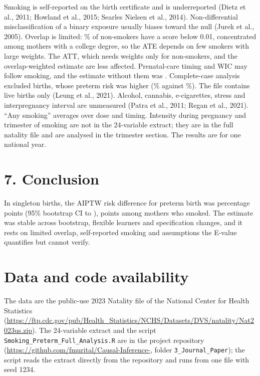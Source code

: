\documentclass[11pt,letterpaper]{article}
\begin{document}
Smoking is self-reported on the birth certificate and is underreported (Dietz et al., 2011; Howland et al., 2015; Searles Nielsen et al., 2014). Non-differential misclassification of a binary exposure usually biases toward the null (Jurek et al., 2005). Overlap is limited: \LowNon{}\% of non-smokers have a score below 0.01, concentrated among mothers with a college degree, so the ATE depends on few smokers with large weights. The ATT, which needs weights only for non-smokers, and the overlap-weighted estimate are less affected. Prenatal-care timing and WIC may follow smoking, and the estimate without them was \RDPre{}. Complete-case analysis excluded \NDropped{} births, whose preterm risk was higher (\DroppedPreterm{}\% against \KeptPreterm{}\%). The file contains live births only (Leung et al., 2021). Alcohol, cannabis, e-cigarettes, stress and interpregnancy interval are unmeasured (Patra et al., 2011; Regan et al., 2021). ``Any smoking'' averages over dose and timing. Intensity during pregnancy and trimester of smoking are not in the 24-variable extract; they are in the full natality file and are analysed in the trimester section. The results are for one national year.

\section*{7. Conclusion}

In \NTotal{} singleton births, the AIPTW risk difference for preterm birth was \RDmain{} percentage points (95\% bootstrap CI \BootLo{} to \BootHi{}), \ATT{} points among mothers who smoked. The estimate was stable across bootstrap, flexible learners and specification changes, and it rests on limited overlap, self-reported smoking and assumptions the E-value quantifies but cannot verify.

\section*{Data and code availability}

The data are the public-use 2023 Natality file of the National Center for Health Statistics (\url{https://ftp.cdc.gov/pub/Health_Statistics/NCHS/Datasets/DVS/natality/Nat2023us.zip}). The 24-variable extract and the script \texttt{Smoking\_Preterm\_Full\_Analysis.R} are in the project repository (\url{https://github.com/fmurital/Causal-Inference-}, folder \texttt{3\_Journal\_Paper}); the script reads the extract directly from the repository and runs from one file with seed 1234.
\end{document}
